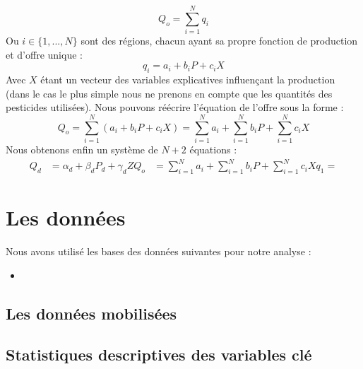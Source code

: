 \documentclass[11pt, a4paper]{article}
\begin{document}
\begin{equation}
    Q_o = \sum_{i = 1}^{N} q_i
\end{equation}
Ou $i \in \{1, ..., N\}$ sont des régions, chacun ayant sa propre fonction de production et d'offre unique : 
\begin{equation}
    q_i = a_i + b_i P + c_i X
\end{equation}
Avec $X$ étant un vecteur des variables explicatives influençant la production (dans le cas le plus simple nous ne prenons en compte que les quantités des pesticides utilisées).
Nous pouvons réécrire l'équation de l'offre sous la forme :
\begin{equation}
    Q_o = \sum_{i = 1}^{N} (a_i + b_i P + c_i X) = \sum_{i = 1}^{N} a_i + \sum_{i = 1}^{N} b_i P + \sum_{i = 1}^{N} c_i X
\end{equation}
Nous obtenons enfin un système de $N + 2$ équations : 
\begin{align*}
    Q_d & = \alpha_d + \beta_d P_d + \gamma_d Z
    Q_o & = \sum_{i = 1}^{N} a_i + \sum_{i = 1}^{N} b_i P + \sum_{i = 1}^{N} c_i X
    q_1 = 
\end{align*}

\section*{Les données}
Nous avons utilisé les bases des données suivantes pour notre analyse :
\begin{itemize}
    \item 
\end{itemize}

\subsection*{Les données mobilisées}

\subsection*{Statistiques descriptives des variables clé}
\end{document}
